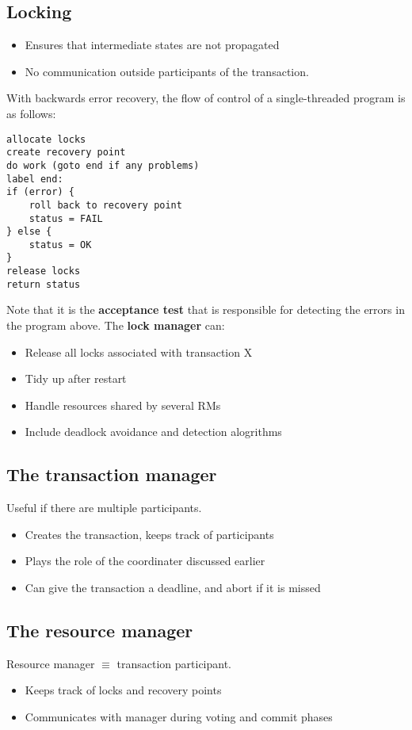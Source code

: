 \subsection{Locking}
\begin{itemize}
    \item Ensures that intermediate states are not propagated
    \item No communication outside participants of the transaction.
\end{itemize}
With backwards error recovery, the flow of control of a single-threaded program is as follows:
\begin{verbatim}
allocate locks
create recovery point
do work (goto end if any problems)
label end:
if (error) {
    roll back to recovery point 
    status = FAIL
} else {
    status = OK
}
release locks
return status
\end{verbatim}
Note that it is the \textbf{acceptance test} that is responsible for detecting the errors in the program above. The \textbf{lock manager} can:
\begin{itemize}
    \item Release all locks associated with transaction X
    \item Tidy up after restart
    \item Handle resources shared by several RMs
    \item Include deadlock avoidance and detection alogrithms
\end{itemize}

\subsection{The transaction manager}
Useful if there are multiple participants.
\begin{itemize}
    \item Creates the transaction, keeps track of participants 
    \item Plays the role of the coordinater discussed earlier
    \item Can give the transaction a deadline, and abort if it is missed
\end{itemize}

\subsection{The resource manager}
Resource manager $\equiv$ transaction participant.
\begin{itemize}
    \item Keeps track of locks and recovery points
    \item Communicates with manager during voting and commit phases
\end{itemize}

